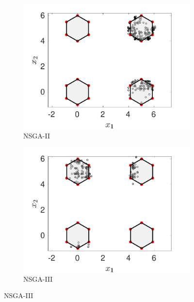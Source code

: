\documentclass[conference]{IEEEtran}
\begin{document}
\begin{figure}[htbp]
    \centering
    \begin{subfigure}[b]{.22\textwidth}
    \includegraphics[width=\linewidth]{Section5/dim4/PS/NSGAII}
    \caption{NSGA-II}
    \end{subfigure}
    \begin{subfigure}[b]{.22\textwidth}
    \includegraphics[width=\linewidth]{Section5/dim4/PS/NSGAIII}
    \caption{NSGA-III}
    \end{subfigure}
    

\end{figure}
\end{document}
